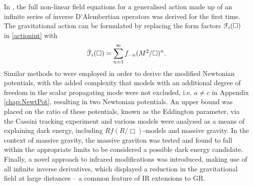 In \cite{Conroy:2014eja}, the full non-linear field equations for a generalised action made up of an infinite series of inverse D'Alembertian operators was derived for the first time. The gravitational action can be formulated by replacing the form factors ${\cal F}_i(\Box)$ in \eqref{actionint} with
\[
{\cal {\bar F}}_i(\Box)=\sum_{n=1}^{\infty} f_{-n}(M^2/\Box)^n
.\]
Similar methods to \cite{Biswas:2011ar} were employed in order to derive the modified Newtonian potentials, with the added complexity that models with an additional degree of freedom in the scalar propagating mode were not excluded, i.e. $a\neq c$ in Appendix \ref{chap:NewtPot}, resulting in two Newtonian potentials. An upper bound was placed on the ratio of these potentials, known as the Eddington parameter, via the Cassini tracking experiment and various models were analysed as a means of explaining dark energy, including $Rf(R/\Box)$-models \cite{Deser:2007jk} and massive gravity. In the context of massive gravity, the massive graviton was tested and found to fall within the appropriate limits to be considered a possible dark energy candidate. Finally, a novel approach to infrared modifications was introduced, making use of all infinite inverse derivatives, which displayed a reduction in the gravitational field at large distances -- a common feature of IR extensions to GR.  
\newpage

